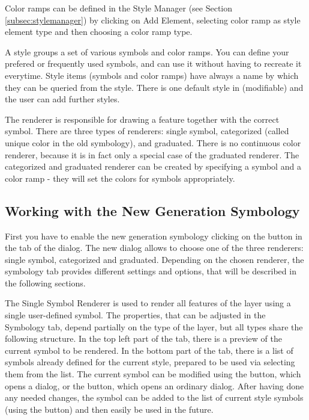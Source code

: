 Color ramps can be defined in the Style Manager (see Section 
\ref{subsec:stylemanager}) by clicking on Add Element, selecting color ramp 
as style element type and then choosing a color ramp type.


A style groups a set of various symbols and color ramps. You can define your 
prefered or frequently used symbols, and can use it  without having to recreate 
it everytime. Style items (symbols and color ramps) have always a name by which 
they can be queried from the style. There is one default style in \qg (modifiable) 
and the user can add further styles.


The renderer is responsible for drawing a feature together with the correct 
symbol. There are three types of renderers: single symbol, categorized (called 
unique color in the old symbology), and graduated. There is no continuous color 
renderer, because it is in fact only a special case of the graduated renderer. 
The categorized and graduated renderer can be created by specifying a symbol 
and a color ramp - they will set the colors for symbols appropriately. 

\subsection{Working with the New Generation Symbology}

First you have to enable the new generation symbology clicking on the 
 button in the  tab of the 
 dialog. The new dialog allows to choose one of the 
three renderers: single symbol, categorized and graduated. Depending on the 
chosen renderer, the symbology tab provides different settings and options, that 
will be described in the following sections.


The Single Symbol Renderer is used to render all features of the layer using a 
single user-defined symbol. The properties, that can be adjusted in the 
Symbology tab, depend partially on the type of the layer, but all types share 
the following structure. In the top left part of the tab, there is a preview of 
the current symbol to be rendered. In the bottom part of the tab, there is a 
list of symbols already defined for the current style, prepared to be used via 
selecting them from the list. The current symbol can be modified using the 
 button, which opens a  dialog, or 
the  button, which opens an ordinary  dialog.
After having done any needed changes, the symbol can be added to the list of 
current style symbols (using the  button) and then easily 
be used in the future.
 

